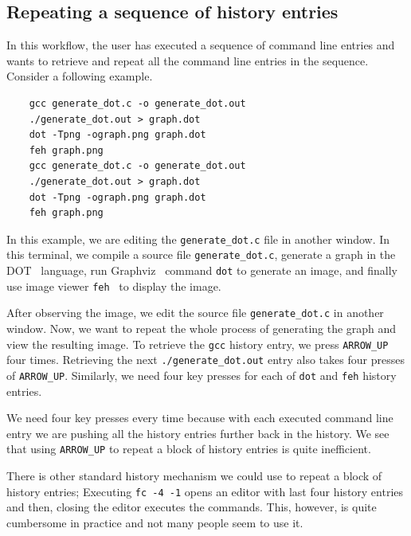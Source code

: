 \documentclass[thesis=M,english]{FITthesis}[2012/10/20]
\let\myCite\cite
\renewcommand\cite{\unskip~\myCite}
\begin{document}
\subsection{Repeating a sequence of history entries}

In this workflow, the user has executed a sequence of command line entries and wants to retrieve and repeat all the command line entries in the sequence. 
Consider a following example.

\begin{verbatim}
    gcc generate_dot.c -o generate_dot.out
    ./generate_dot.out > graph.dot
    dot -Tpng -ograph.png graph.dot
    feh graph.png
    gcc generate_dot.c -o generate_dot.out
    ./generate_dot.out > graph.dot
    dot -Tpng -ograph.png graph.dot
    feh graph.png
\end{verbatim}

In this example, we are editing the \verb|generate_dot.c| file in another window. In this terminal, we compile a source file \verb|generate_dot.c|, generate a graph in the DOT\cite{graphvizthedotlanguage} language, run Graphviz\cite{ellson2001graphviz} command \verb|dot| to generate an image, and finally use image viewer \verb|feh|\cite{toolsfeh} to display the image.

After observing the image, we edit the source file \verb|generate_dot.c| in another window.
Now, we want to repeat the whole process of generating the graph and view the resulting image. To retrieve the \verb|gcc| history entry, we press \verb|ARROW_UP| four times. Retrieving the next \verb|./generate_dot.out| entry also takes four presses of \verb|ARROW_UP|. Similarly, we need four key presses for each of \verb|dot| and \verb|feh| history entries. 

We need four key presses every time because with each executed command line entry we are pushing all the history entries further back in the history. We see that using \verb|ARROW_UP| to repeat a block of history entries is quite inefficient.  

There is other standard history mechanism we could use to repeat a block of history entries; 
Executing \verb|fc -4 -1| opens an editor with last four history entries and then, closing the editor executes the commands. This, however, is quite cumbersome in practice and not many people seem to use it. 
\end{document}
